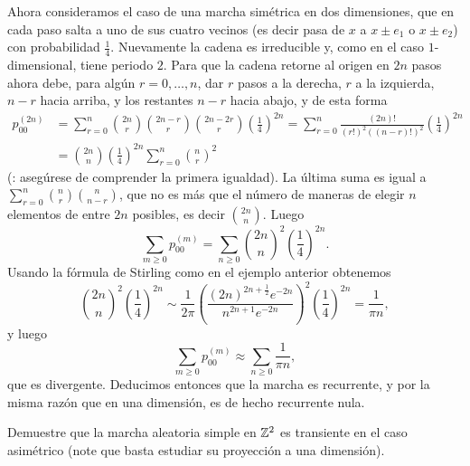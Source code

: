 \begin{ex}\label{ex:srw-2-a}
Ahora consideramos el caso de una marcha simétrica en dos dimensiones, que en cada paso salta a uno de sus cuatro vecinos (es decir pasa de $x$ a $x\pm e_1$ o $x\pm e_2$) con probabilidad $\frac14$.
Nuevamente la cadena es irreducible y, como en el caso $1$-dimensional, tiene periodo $2$.
Para que la cadena retorne al origen en $2n$ pasos ahora debe, para algún $r=0,\dotsc,n$, dar $r$ pasos a la derecha, $r$ a la izquierda, $n-r$ hacia arriba, y los restantes $n-r$ hacia abajo, y de esta forma
\begin{align}
p^{(2n)}_{00}&=\sum_{r=0}^n\binom{2n}{r}\binom{2n-r}{r}\binom{2n-2r}{r}\left(\frac14\right)^{2n}
=\sum_{r=0}^n\frac{(2n)!}{(r!)^2((n-r)!)^2}\left(\frac14\right)^{2n}\\
&=\binom{2n}{n}\left(\frac14\right)^{2n}\sum_{r=0}^n\binom{n}{r}^2
\end{align}
(\uexers: asegúrese de comprender la primera igualdad).
La última suma es igual a $\sum_{r=0}^n\binom{n}{r}\binom{n}{n-r}$, que no es más que el número de maneras de elegir $n$ elementos de entre $2n$ posibles, es decir $\binom{2n}{n}$.
Luego
\[\sum_{m\geq0}p^{(m)}_{00}=\sum_{n\geq0}\binom{2n}{n}^2\left(\frac14\right)^{2n}.\]
Usando la fórmula de Stirling como en el ejemplo anterior obtenemos
\[\binom{2n}{n}^2\left(\frac14\right)^{2n}\sim\frac1{2\pi}\left(\frac{(2n)^{2n+\frac12}e^{-2n}}{n^{2n+1}e^{-2n}}\right)^2\left(\frac14\right)^{2n}=\frac1{\pi n},\]
y luego
\[\sum_{m\geq0}p^{(m)}_{00}\approx\sum_{n\geq0}\frac1{\pi n},\]
que es divergente.
Deducimos entonces que la marcha es recurrente, y por la misma razón que en una dimensión, es de hecho recurrente nula.
\end{ex}

\begin{exer}
Demuestre que la marcha aleatoria simple en $\mathbb{Z}^2$ es transiente en el caso asimétrico (note que basta estudiar su proyección a una dimensión).
\end{exer}

